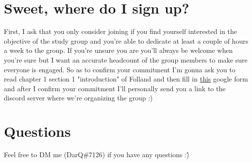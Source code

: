 \documentclass{article}
\begin{document}
\section{Sweet, where do I sign up?}
First, I ask that you only consider joining if you find yourself interested in the objective of the study group and you're able to dedicate at least a couple of hours a week to the group. If you're unsure you are you'll always be welcome when you're sure but I want an accurate headcount of the group members to make sure everyone is engaged. So as to confirm your commitment I'm gonna ask you to read chapter 1 section 1 "introduction" of Folland and then fill in \href{https://docs.google.com/forms/d/e/1FAIpQLSfBfSXGfLJCOsI43vFtWFRaY8jWbum7rY_5jI1e2Ou2RtrFgg/viewform?usp=sf_link}{this} google form and after I confirm your commitment I'll personally send you a link to the discord server where we're organizing the group :)

\section{Questions}
Feel free to DM me (DarQ\#7126) if you have any questions :\^)
\end{document}
